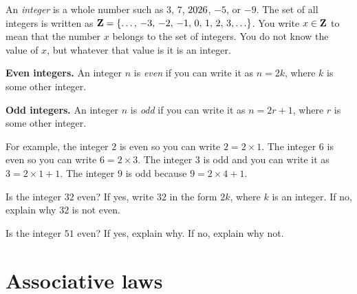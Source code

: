 \documentclass[a4paper,oneside,12pt]{article}
\begin{document}
An \emph{integer} is a whole number such as $3$, $7$, $\the\year$,
$-5$, or $-9$.  The set of all integers is written as
$\ZZ = \set{\dots,\, -3,\, -2,\, -1,\, 0,\, 1,\, 2,\, 3,\dots}$.  You
write $x \in \mathbf{Z}$ to mean that the number $x$ belongs to the set of
integers.  You do not know the value of $x$, but whatever that value
is it is an integer.

\begin{definition}
\textbf{Even integers.}
An integer $n$ is \emph{even} if you can write it as $n = 2k$, where
$k$ is some other integer.
\end{definition}

\begin{definition}
\textbf{Odd integers.}
An integer $n$ is \emph{odd} if you can write it as $n = 2r + 1$,
where $r$ is some other integer.
\end{definition}

For example, the integer $2$ is even so you can write
$2 = 2 \times 1$.  The integer $6$ is even so you can write
$6 = 2 \times 3$.  The integer $3$ is odd and you can write it as
$3 = 2 \times 1 + 1$.  The integer $9$ is odd because
$9 = 2 \times 4 + 1$.

\begin{exercise}
Is the integer $32$ even?  If yes, write $32$ in the form $2k$, where
$k$ is an integer.  If no, explain why $32$ is not even.
\end{exercise}


\begin{exercise}
Is the integer $51$ even?  If yes, explain why.  If no, explain why
not.
\end{exercise}




\section{Associative laws}
\end{document}
